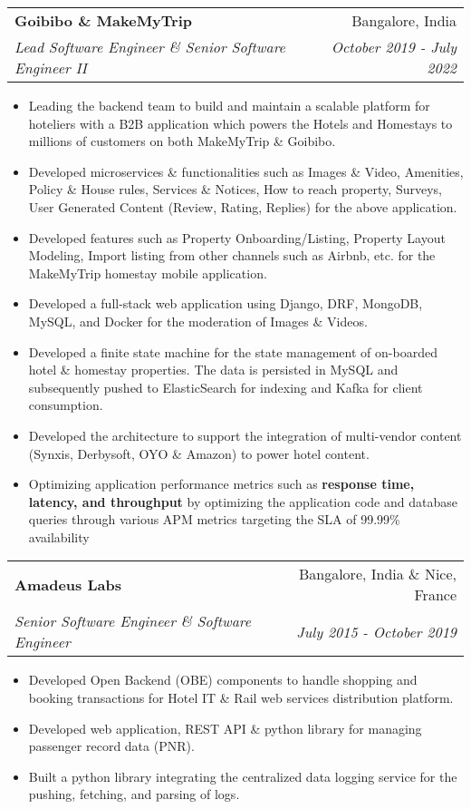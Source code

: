 \documentclass[letterpaper,11pt]{article}
\makeatletter
\newcommand{\resumeItem}[1]{
  \item\small{
    {#1 \vspace{-2pt}}
  }
}
\newcommand{\resumeSubheading}[4]{
  \vspace{-2pt}\item
    \begin{tabular*}{0.97\textwidth}[t]{l@{\extracolsep{\fill}}r}
      \textbf{#1} & #2 \\
      \textit{\small#3} & \textit{\small #4} \\
    \end{tabular*}\vspace{-7pt}
}
\newcommand{\resumeSubSubheading}[2]{
    \item
    \begin{tabular*}{0.97\textwidth}{l@{\extracolsep{\fill}}r}
      \textit{\small#1} & \textit{\small #2} \\
    \end{tabular*}\vspace{-7pt}
}
\newcommand{\resumeSubHeadingListEnd}{\end{itemize}}
\newcommand{\resumeItemListStart}{\begin{itemize}}
\newcommand{\resumeItemListEnd}{\end{itemize}\vspace{-5pt}}
\makeatother
\begin{document}
\resumeSubheading
{Goibibo \& MakeMyTrip }{Bangalore, India}
{Lead Software Engineer \& Senior Software Engineer II}{October 2019 - July 2022}
\resumeItemListStart		
\resumeItem{Leading the backend team to build and maintain a scalable platform for hoteliers with a B2B application which powers the Hotels and Homestays to millions of customers on both MakeMyTrip \& Goibibo.}
\resumeItem{Developed microservices \& functionalities such as Images \& Video, Amenities, Policy \& House rules, Services \& Notices, How to reach property, Surveys, User Generated Content (Review, Rating, Replies) for the above application.}
\resumeItem{Developed features such as Property Onboarding/Listing, Property Layout Modeling, Import listing from other channels such as Airbnb, etc. for the MakeMyTrip homestay mobile application.}
\resumeItem{Developed a full-stack web application using Django, DRF, MongoDB, MySQL, and Docker for the moderation of Images \& Videos.}
\resumeItem{Developed a finite state machine for the state management of on-boarded hotel \& homestay properties. The data is persisted in MySQL and subsequently pushed to ElasticSearch for indexing and Kafka for client consumption.}
\resumeItem{Developed the architecture to support the integration of multi-vendor content (Synxis, Derbysoft, OYO \& Amazon) to power hotel content.}
\resumeItem{Optimizing application performance metrics such as \textbf{response time, latency, and throughput} by optimizing the application code and database queries through various APM metrics targeting the SLA of 99.99\% availability}
\resumeItemListEnd
      

\resumeSubheading
{Amadeus Labs}{Bangalore, India \& Nice, France}
{Senior Software Engineer \& Software Engineer}{July 2015 - October 2019}
\resumeItemListStart
\resumeItem{Developed Open Backend (OBE) components to handle shopping and booking transactions for Hotel IT \& Rail web services distribution platform.}
\resumeItem{Developed web application, REST API \& python library for managing passenger record data (PNR).}
\resumeItem{Built a python library integrating the centralized data logging service for the pushing, fetching, and parsing of logs.}
\resumeItemListEnd
\end{document}
